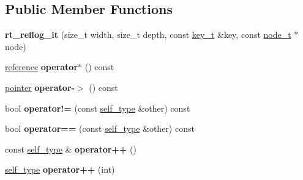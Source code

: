 \subsection*{Public Member Functions}
\begin{DoxyCompactItemize}
\item 
\mbox{\label{classdialog_1_1index_1_1rt__reflog__it_a889b940ed24994443ed4813fc28ad24f}} 
{\bfseries rt\+\_\+reflog\+\_\+it} (size\+\_\+t width, size\+\_\+t depth, const \hyperlink{classdialog_1_1byte__string}{key\+\_\+t} \&key, const \hyperlink{structdialog_1_1index_1_1radix__tree__node}{node\+\_\+t} $\ast$node)
\item 
\mbox{\label{classdialog_1_1index_1_1rt__reflog__it_a85df837e216be3d05f1082c985ff959d}} 
\hyperlink{classdialog_1_1monolog_1_1monolog__exp2__linear}{reference} {\bfseries operator$\ast$} () const
\item 
\mbox{\label{classdialog_1_1index_1_1rt__reflog__it_aed72ec37276403015fda07dbcfcf549a}} 
\hyperlink{classdialog_1_1monolog_1_1monolog__exp2__linear}{pointer} {\bfseries operator-\/$>$} () const
\item 
\mbox{\label{classdialog_1_1index_1_1rt__reflog__it_a482342b944736cee47f4fc0647ca7de0}} 
bool {\bfseries operator!=} (const \hyperlink{classdialog_1_1index_1_1rt__reflog__it}{self\+\_\+type} \&other) const
\item 
\mbox{\label{classdialog_1_1index_1_1rt__reflog__it_a538c52cf9ed38a45fcbbdd6563a34c56}} 
bool {\bfseries operator==} (const \hyperlink{classdialog_1_1index_1_1rt__reflog__it}{self\+\_\+type} \&other) const
\item 
\mbox{\label{classdialog_1_1index_1_1rt__reflog__it_a233c5f0e359e9ebd49bf1fd832444ac7}} 
const \hyperlink{classdialog_1_1index_1_1rt__reflog__it}{self\+\_\+type} \& {\bfseries operator++} ()
\item 
\mbox{\label{classdialog_1_1index_1_1rt__reflog__it_a88eb88a182cb9bcfb17e1a8294f806e7}} 
\hyperlink{classdialog_1_1index_1_1rt__reflog__it}{self\+\_\+type} {\bfseries operator++} (int)

\end{DoxyCompactItemize}
